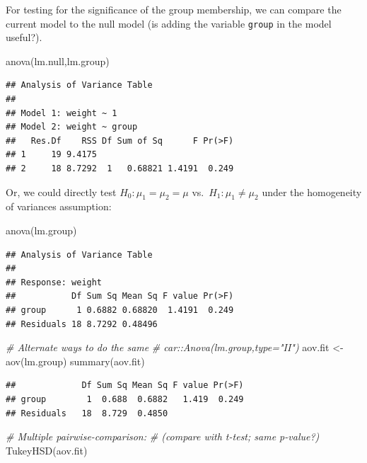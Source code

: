 \documentclass[
]{book}
\newenvironment{Shaded}{\begin{snugshade}}{\end{snugshade}}
\newcommand{\CommentTok}[1]{\textcolor[rgb]{0.56,0.35,0.01}{\textit{#1}}}
\newcommand{\FunctionTok}[1]{\textcolor[rgb]{0.00,0.00,0.00}{#1}}
\newcommand{\NormalTok}[1]{#1}
\newcommand{\OtherTok}[1]{\textcolor[rgb]{0.56,0.35,0.01}{#1}}
\begin{document}
For testing for the significance of the group membership, we can compare the current model to the null model (is adding the variable \texttt{group} in the model useful?).

\begin{Shaded}
\begin{Highlighting}[]
\FunctionTok{anova}\NormalTok{(lm.null,lm.group)}
\end{Highlighting}
\end{Shaded}

\begin{verbatim}
## Analysis of Variance Table
## 
## Model 1: weight ~ 1
## Model 2: weight ~ group
##   Res.Df    RSS Df Sum of Sq      F Pr(>F)
## 1     19 9.4175                           
## 2     18 8.7292  1   0.68821 1.4191  0.249
\end{verbatim}

Or, we could directly test \(H_0 : \mu_1 = \mu_2 = \mu\) vs.~\(H_1 : \mu_1 \ne \mu_2\) under the homogeneity of variances assumption:

\begin{Shaded}
\begin{Highlighting}[]
\FunctionTok{anova}\NormalTok{(lm.group)}
\end{Highlighting}
\end{Shaded}

\begin{verbatim}
## Analysis of Variance Table
## 
## Response: weight
##           Df Sum Sq Mean Sq F value Pr(>F)
## group      1 0.6882 0.68820  1.4191  0.249
## Residuals 18 8.7292 0.48496
\end{verbatim}

\begin{Shaded}
\begin{Highlighting}[]
\CommentTok{\# Alternate ways to do the same}
\CommentTok{\# car::Anova(lm.group,type="II")}
\NormalTok{aov.fit }\OtherTok{\textless{}{-}} \FunctionTok{aov}\NormalTok{(lm.group)}
\FunctionTok{summary}\NormalTok{(aov.fit)}
\end{Highlighting}
\end{Shaded}

\begin{verbatim}
##             Df Sum Sq Mean Sq F value Pr(>F)
## group        1  0.688  0.6882   1.419  0.249
## Residuals   18  8.729  0.4850
\end{verbatim}

\begin{Shaded}
\begin{Highlighting}[]
\CommentTok{\# Multiple pairwise{-}comparison: }
\CommentTok{\# (compare with t{-}test; same p{-}value?)}
\FunctionTok{TukeyHSD}\NormalTok{(aov.fit) }
\end{Highlighting}
\end{Shaded}
\end{document}

